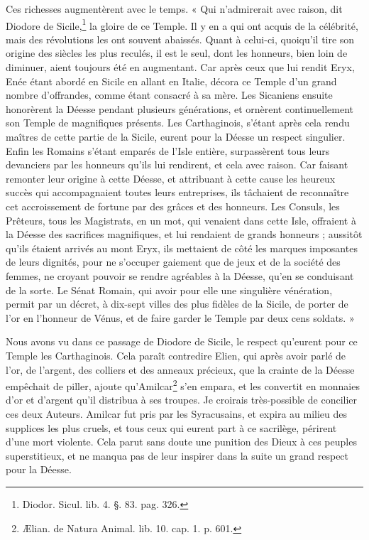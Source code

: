 \documentclass[a4paper, 18pt, oneside]{article}
\begin{document}
Ces richesses augmentèrent avec le temps. « Qui n'admirerait avec raison, dit Diodore de Sicile,\footnote{Diodor. Sicul. lib. 4. §. 83. pag. 326.} la gloire de ce Temple. Il y en a qui ont acquis de la célébrité, mais des révolutions les ont souvent abaissés. Quant à celui-ci, quoiqu'il tire son origine des siècles les plus reculés, il est le seul, dont les honneurs, bien loin de diminuer, aient toujours été en augmentant. Car après ceux que lui rendit Eryx, Enée étant abordé en Sicile en allant en Italie, décora ce Temple d'un grand nombre d'offrandes, comme étant consacré à sa mère. Les Sicaniens ensuite honorèrent la Déesse pendant plusieurs générations, et ornèrent continuellement son Temple de magnifiques présents. Les Carthaginois, s'étant après cela rendu maîtres de cette partie de la Sicile, eurent pour la Déesse un respect singulier. Enfin les Romains s'étant emparés de l'Isle entière, surpassèrent tous leurs devanciers par les honneurs qu'ils lui rendirent, et cela avec raison. Car faisant remonter leur origine à cette Déesse, et attribuant à cette cause les heureux succès qui accompagnaient toutes leurs entreprises, ils tâchaient de reconnaître cet accroissement de fortune par des grâces et des honneurs. Les Consuls, les Prêteurs, tous les Magistrats, en un mot, qui venaient dans cette Isle, offraient à la Déesse des sacrifices magnifiques, et lui rendaient de grands honneurs ; aussitôt qu'ils étaient arrivés au mont Eryx, ils mettaient de côté les marques imposantes de leurs dignités, pour ne s'occuper gaiement que de jeux et de la société des femmes, ne croyant pouvoir se rendre agréables à la Déesse, qu'en se conduisant de la sorte. Le Sénat Romain, qui avoir pour elle une singulière vénération, permit par un décret, à dix-sept villes des plus fidèles de la Sicile, de porter de l'or en l'honneur de Vénus, et de faire garder le Temple par deux cens soldats. »

Nous avons vu dans ce passage de Diodore de Sicile, le respect qu'eurent pour ce Temple les Carthaginois. Cela paraît contredire Elien, qui après avoir parlé de l'or, de l'argent, des colliers et des anneaux précieux, que la crainte de la Déesse empêchait de piller, ajoute qu'Amilcar\footnote{Ælian. de Natura Animal. lib. 10. cap. 1. p. 601.} s'en empara, et les convertit en monnaies d'or et d'argent qu'il distribua à ses troupes. Je croirais très-possible de concilier ces deux Auteurs. Amilcar fut pris par les Syracusains, et expira au milieu des supplices les plus cruels, et tous ceux qui eurent part à ce sacrilège, périrent d'une mort violente. Cela parut sans doute une punition des Dieux à ces peuples superstitieux, et ne manqua pas de leur inspirer dans la suite un grand respect pour la Déesse.
\end{document}
